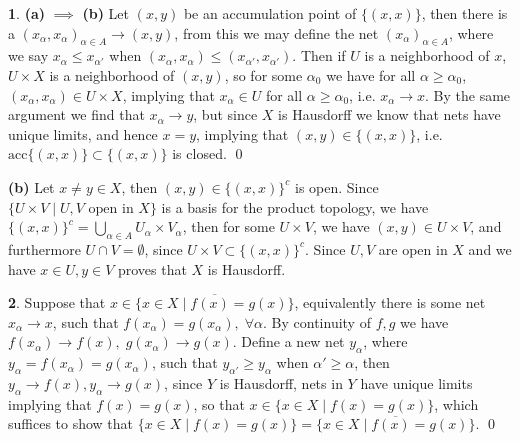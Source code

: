 \documentclass[10.5pt]{article}
\theoremstyle{definition}
\newtheorem{pb}{}
\newcommand{\set}[1]{\{#1\}}
\begin{document}
    \begin{pb}
        \textbf{(a)} \(\implies\) \textbf{(b)} Let \((x,y)\) be an accumulation point of \(\set{(x,x)}\), then there is a \((x_\alpha,x_\alpha)_{\alpha\in A} \to (x,y)\), from this we may define the net \((x_\alpha)_{\alpha \in A}\), where we say \(x_\alpha \leq x_{\alpha'}\) when \((x_\alpha,x_\alpha) \leq (x_{\alpha'},x_{\alpha'})\). Then if \(U\) is a neighborhood of \(x\), \(U \times X\) is a neighborhood of \((x,y)\), so for some \(\alpha_0\) we have for all \(\alpha \geq \alpha_0\), \((x_\alpha,x_\alpha) \in U \times X\), implying that \(x_\alpha \in U\) for all \(\alpha \geq \alpha_0\), i.e. \(x_\alpha \to x\).  By the same argument we find that \(x_\alpha \to y\), but since \(X\) is Hausdorff we know that nets have unique limits, and hence \(x = y\), implying that \((x,y) \in \set{(x,x)}\), i.e. \(\text{acc}\set{(x,x)} \subset \set{(x,x)}\) is closed. \qed

        \textbf{(b)} Let \(x \neq y \in X\), then \((x,y) \in \set{(x,x)}^c\) is open. Since \(\set{U \times V \mid U,V \text{ open in } X}\) is a basis for the product topology, we have \(\set{(x,x)}^c = \bigcup_{\alpha \in A} U_\alpha \times V_\alpha\), then for some \(U\times V\), we have \((x,y) \in U \times V\), and furthermore \(U \cap V = \emptyset\), since \(U \times V \subset \set{(x,x)}^c\). Since \(U, V\) are open in \(X\) and we have \(x \in U, y \in V\) proves that \(X\) is Hausdorff.
    \end{pb}
    \begin{pb}
        Suppose that \(x \in \overline{\set{x \in X \mid f(x) = g(x)}}\), equivalently there is some net \(x_\alpha \to x\), such that \(f(x_\alpha) = g(x_\alpha), \; \forall \alpha\). By continuity of \(f,g\) we have \(f(x_\alpha) \to f(x), \; g(x_\alpha) \to g(x)\). Define a new net \(y_\alpha\), where \(y_\alpha = f(x_\alpha) = g(x_\alpha)\), such that \(y_{\alpha'} \geq y_\alpha\) when \(\alpha' \geq \alpha\), then \(y_\alpha \to f(x),y_\alpha \to g(x)\), since \(Y\) is Hausdorff, nets in \(Y\) have unique limits implying that \(f(x) = g(x)\), so that \(x \in \set{x \in X \mid f(x) = g(x)}\), which suffices to show that \(\set{x \in X \mid f(x) = g(x)} = \overline{\set{x \in X \mid f(x) = g(x)}}\). \qed
    \end{pb}
\end{document}
